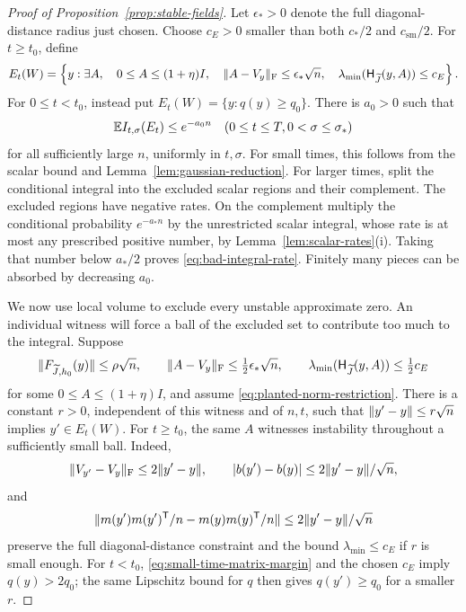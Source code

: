 \begin{proof}[Proof of Proposition~\ref{prop:stable-fields}]
Let $\epsilon_*>0$ denote the full diagonal-distance radius just chosen.
Choose $c_E>0$ smaller than both $c_*/2$ and $c_{\mathrm{sm}}/2$.
For $t\ge t_0$, define
\[
 E_t(W)=\left\{y:\exists A,\quad
 0\le A\le(1+\eta)I,\quad
 \lVert A-V_y\rVert_{\mathrm F}\le\epsilon_*\sqrt n,\quad
 \lambda_{\min}(\mathsf H_{\widetilde J}(y,A))\le c_E\right\}.
\]
For $0\le t<t_0$, instead put $E_t(W)=\{y:q(y)\ge q_0\}$.
There is $a_0>0$ such that
\begin{equation}
 \mathbb E I_{t,\sigma}(E_t)\le e^{-a_0n}
 \quad(0\le t\le T, 0<\sigma\le\sigma_*)
 \label{eq:bad-integral-rate}
\end{equation}
for all sufficiently large $n$, uniformly in $t,\sigma$.
For small times, this follows from the scalar bound and
Lemma~\ref{lem:gaussian-reduction}. For larger times, split the
conditional integral into the excluded scalar regions and their complement.
The excluded regions have negative rates.  On the complement multiply
the conditional probability $e^{-a_*n}$ by the unrestricted scalar
integral, whose rate is at most any prescribed positive number, by
Lemma~\ref{lem:scalar-rates}\textup{(i)}.  Taking that number below
$a_*/2$ proves \eqref{eq:bad-integral-rate}.  Finitely many pieces can
be absorbed by decreasing $a_0$.

We now use local volume to exclude every unstable approximate zero.
An individual witness will force a ball of the excluded set to contribute
too much to the integral. Suppose
\begin{equation}
 \lVert F_{\widetilde J,h_0}(y)\rVert\le\rho\sqrt n,\qquad
 \lVert A-V_y\rVert_{\mathrm F}\le\tfrac12\epsilon_*\sqrt n,\qquad
 \lambda_{\min}(\mathsf H_{\widetilde J}(y,A))\le\tfrac12c_E
 \label{eq:bad-approximate-point}
\end{equation}
for some $0\le A\le(1+\eta)I$, and assume
\eqref{eq:planted-norm-restriction}.  There is a constant $r>0$,
independent of this witness and of $n,t$, such that
$\lVert y'-y\rVert\le r\sqrt n$ implies $y'\in E_t(W)$.
For $t\ge t_0$, the same $A$ witnesses instability throughout a
sufficiently small ball. Indeed,
\[
 \lVert V_{y'}-V_y\rVert_{\mathrm F}\le2\lVert y'-y\rVert,\qquad
 |b(y')-b(y)|\le2\lVert y'-y\rVert/\sqrt n,
\]
and
\[
 \lVert m(y')m(y')^{\mathsf T}/n-m(y)m(y)^{\mathsf T}/n\rVert
 \le2\lVert y'-y\rVert/\sqrt n
\]
preserve the full diagonal-distance constraint and the bound
$\lambda_{\min}\le c_E$ if $r$ is small enough.  For $t<t_0$,
\eqref{eq:small-time-matrix-margin} and the chosen $c_E$ imply
$q(y)>2q_0$; the same Lipschitz bound for $q$ then gives
$q(y')\ge q_0$ for a smaller $r$.


\end{proof}
